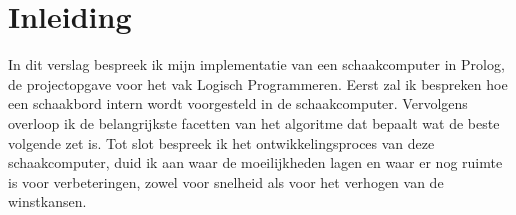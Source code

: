 \chapter*{Inleiding}

In dit verslag bespreek ik mijn implementatie van een schaakcomputer in Prolog, de projectopgave voor het vak Logisch Programmeren. Eerst zal ik bespreken hoe een schaakbord intern wordt voorgesteld in de schaakcomputer. Vervolgens overloop ik de belangrijkste facetten van het algoritme dat bepaalt wat de beste volgende zet is. Tot slot bespreek ik het ontwikkelingsproces van deze schaakcomputer, duid ik aan waar de moeilijkheden lagen en waar er nog ruimte is voor verbeteringen, zowel voor snelheid als voor het verhogen van de winstkansen.